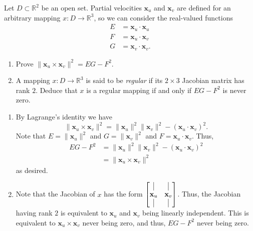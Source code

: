 \documentclass[12 pt, letterpaper]{hmcpset}
\begin{document}
\begin{problem}[Problem 1.]
	Let $D \subset \mathbb{R}^{2}$  be an open set. Partial velocities $\mathbf{x}_{u}$  and $\mathbf{x}_{v}$  are defined for an arbitrary mapping $x : D \to \mathbb{R}^{3}$, so we can consider the real-valued functions
	\[
		\begin{split}
			E & = \mathbf{x}_{u} \cdot \mathbf{x}_{u} \\
			F & = \mathbf{x}_{u} \cdot \mathbf{x}_{v} \\
			G & = \mathbf{x}_{v} \cdot \mathbf{x}_{v}.
		\end{split}
	\]
	\begin{enumerate}
		\item Prove $\lVert \mathbf{x}_{u} \times \mathbf{x}_{v} \rVert^{2} = EG - F^{2}$.
		\item A mapping $x : D \to \mathbb{R}^{3}$ is said to be \textit{regular} if its $2 \times 3$ Jacobian matrix has rank $2$. Deduce that $x$ is a regular mapping if and only if $EG - F^{2}$ is never zero.
	\end{enumerate}
\end{problem}

\begin{solution}
	\begin{enumerate}
		\item By Lagrange's identity we have
			\[
				\lVert \mathbf{x}_{u} \times \mathbf{x}_{v} \rVert^{2} = \lVert \mathbf{x}_{u} \rVert^{2} \lVert \mathbf{x}_{v} \rVert^{2} - (\mathbf{x}_{u} \cdot \mathbf{x}_{v})^{2}.
			\]
			Note that $E = \lVert \mathbf{x}_{u} \rVert^{2}$ and $G = \lVert \mathbf{x}_{v} \rVert^{2}$ and $F = \mathbf{x}_{u} \cdot \mathbf{x}_{v}$. Thus,
			\[
				\begin{split}
					EG - F^{2} & = \lVert \mathbf{x}_{u} \rVert^{2} \lVert \mathbf{x}_{v} \rVert^{2} - ( \mathbf{x}_{u} \cdot \mathbf{x}_{v})^{2} \\
						   & = \lVert \mathbf{x}_{u} \times \mathbf{x}_{v} \rVert^{2}
				\end{split}
			\]
			as desired.
		\item Note that the Jacobian of $x$ has the form $\begin{bmatrix}
				\vline & \vline \\
				\mathbf{x}_{u} & \mathbf{x}_{v} \\
				\vline & \vline
		\end{bmatrix}$. Thus, the Jacobian having rank $2$ is equivalent to $\mathbf{x}_{u}$ and $\mathbf{x}_{v}$ being linearly independent. This is equivalent to $\mathbf{x}_{u} \times \mathbf{x}_{v}$ never being zero, and thus, $EG - F^2$ never being zero.
	\end{enumerate}
\end{solution}
\end{document}
